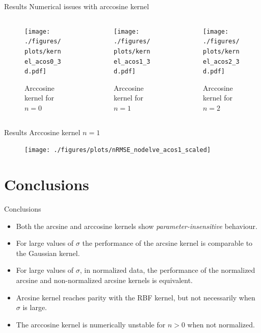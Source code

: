 \documentclass[aspectratio=169]{beamer}
\begin{document}
\begin{frame}{Results \textendash{} Numerical issues with arccosine kernel}
	\begin{columns}
		\begin{column}{0.33\textwidth}
			\begin{figure}[H]
				\texttt{[image: ./figures/plots/kernel\_acos0\_3d.pdf]}
				\caption*{Arccosine kernel for $n=0$}
			\end{figure}
		\end{column}
		\begin{column}{0.33\textwidth}
			\begin{figure}[H]
				\texttt{[image: ./figures/plots/kernel\_acos1\_3d.pdf]}
				\caption*{Arccosine kernel for $n=1$}
			\end{figure}
		\end{column}
		\begin{column}{0.33\textwidth}
			\begin{figure}[H]
				\texttt{[image: ./figures/plots/kernel\_acos2\_3d.pdf]}
				\caption*{Arccosine kernel for $n=2$}
			\end{figure}
		\end{column}
	\end{columns}
\end{frame}

\begin{frame}{Results \textendash{} Arccosine kernel $n=1$}
	\begin{figure}[H]
		\texttt{[image: ./figures/plots/nRMSE\_nodelve\_acos1\_scaled]}
	\end{figure}
\end{frame}

\section{Conclusions}

\begin{frame}{Conclusions}
	\begin{itemize}%
		\item Both the arcsine and arccosine kernels show \emph{parameter-insensitive} behaviour.
		\item For large values of $\sigma$ the performance of the arcsine kernel is
		      comparable to the Gaussian kernel.
		\item For large values of $\sigma$, in normalized data, the performance
		      of the normalized arcsine and non-normalized arcsine kernels is equivalent.
		\item Arcsine kernel reaches parity with the RBF kernel, but not necessarily
		      when $\sigma$ is large.
		\item The arccosine kernel is numerically unstable for $n>0$ when not
		      normalized.
	\end{itemize}
\end{frame}
\end{document}

